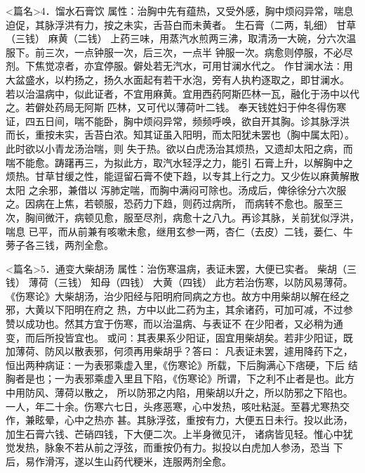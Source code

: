 \documentclass[a4paper,12pt,UTF8,twoside]{ctexbook}
\begin{document}
<篇名>4．馏水石膏饮
属性：治胸中先有蕴热，又受外感，胸中烦闷异常，喘息迫促，其脉浮洪有力，按之未实，舌苔白而未黄者。 
生石膏（二两，轧细） 甘草（三钱） 麻黄（二钱） 
上药三味，用蒸汽水煎两三沸，取清汤一大碗，分六次温服下。前三次，一点钟服一次，后三次，一点半 
钟服一次。病愈则停服，不必尽剂。下焦觉凉者，亦宜停服。僻处若无汽水，可用甘澜水代之。 
作甘澜水法∶用大盆盛水，以杓扬之，扬久水面起有若干水泡，旁有人执杓逐取之，即甘澜水。 
若以治温病中，似此证者，不宜用麻黄。宜用西药阿斯匹林一瓦，融化于汤中以代之。若僻处药局无阿斯 
匹林，又可代以薄荷叶二钱。 
奉天钱姓妇于仲冬得伤寒证，四五日间，喘不能卧，胸中烦闷异常，频频呼唤，欲自开其胸。诊其脉浮洪 
而长，重按未实，舌苔白浓。知其证虽入阳明，而太阳犹未罢也（胸中属太阳）。此时欲以小青龙汤治喘，则 
失于热。欲以白虎汤治其烦热，又遗却太阳之病，而喘不能愈。踌躇再三，为拟此方，取汽水轻浮之力，能引 
石膏上升，以解胸中之烦热。甘草甘缓之性，能逗留石膏不使下趋，以专其上行之力。又少佐以麻黄解散太阳 
之余邪，兼借以 
泻肺定喘，而胸中满闷可除也。汤成后，俾徐徐分六次服之。因病在上焦，若顿服，恐药力下趋，则药过病所， 
而病转不愈也。服至三次，胸间微汗，病顿见愈，服至尽剂，病愈十之八九。再诊其脉，关前犹似浮洪，喘息 
已平，而从前兼有咳嗽未愈，继用玄参一两，杏仁（去皮）二钱，蒌仁、牛蒡子各三钱，两剂全愈。 


<篇名>5．通变大柴胡汤
属性：治伤寒温病，表证未罢，大便已实者。 
柴胡（三钱） 薄荷（三钱） 知母（四钱） 大黄（四钱） 
此方若治伤寒，以防风易薄荷。 
《伤寒论》大柴胡汤，治少阳经与阳明府同病之方也。故方中用柴胡以解在经之邪，大黄以下阳明在府之 
热，方中以此二药为主，其余诸药，可加可减，不过参赞以成功也。然其方宜于伤寒，而以治温病、与表证不 
在少阳者，又必稍为通变，而后所投皆宜也。 
或问∶其表果系少阳证，固宜用柴胡矣。若非少阳证，既加薄荷、防风以散表邪，何须再用柴胡乎？答曰∶ 
凡表证未罢，遽用降药下之，恒出两种病证∶一为表邪乘虚入里，《伤寒论》所载，下后胸满心下痞硬，下后 
结胸者是也；一为表邪乘虚入里且下陷，《伤寒论》所谓，下之利不止者是也。此方中用防风、薄荷以散之， 
所以防邪之内陷，用柴胡以升之，所以防邪之下陷也。 
一人，年二十余。伤寒六七日，头疼恶寒，心中发热，咳吐粘涎。至暮尤寒热交作，兼眩晕，心中之热亦 
甚。其脉浮弦，重按有力，大便五日未行。投以此汤，加生石膏六钱、芒硝四钱，下大便二次。上半身微见汗， 
诸病皆见轻。惟心中犹觉发热，脉象不若从前之浮弦，而重按仍有力。拟投以白虎加人参汤，恐当 
下后，易作滑泻，遂以生山药代粳米，连服两剂全愈。 
\end{document}
